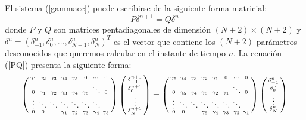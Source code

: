 El sistema (\ref{gammaec}) puede escribirse de la siguiente forma matricial:
\begin{equation}
\label{PQ}
    P\delta^{n+1}=Q\delta^{n}
\end{equation}
\noindent donde $P$ y $Q$ son matrices pentadiagonales de dimensión $(N+2)\times(N+2)$ y $\displaystyle \delta^{n}=(\delta_{-1}^{n},\delta_{0}^{n},\ldots,\delta_{N-1}^{n},\delta_{N}^{n})^{T}$ es el vector que contiene los $(N+2)$ parámetros desconocidos que queremos calcular en el instante de tiempo $n$. La ecuación (\ref{PQ}) presenta la siguiente forma:
 \begin{equation}\label{Matrizge}
     \small{
     \left(\begin{smallmatrix}
        \gamma_{1} & \gamma_{2} & \gamma_{3} & \gamma_{4} & \gamma_{5} & 0 & \cdots & 0\\
        0 & \gamma_{1} & \gamma_{2} & \gamma_{3} & \gamma_{4} & \gamma_{5} & \ddots & 0\\
        \vdots & \ddots & \ddots & \ddots & \ddots &\ddots & \ddots\\
        0 & 0 & \cdots & \gamma_{1} & \gamma_{2} & \gamma_{3} & \gamma_{4} & \gamma_{5}
    \end{smallmatrix}\right)
    \left(\begin{smallmatrix}
       \delta_{-1}^{n+1} \\
       \delta_{0}^{n+1}\\
        \vdots\\
        \delta_{N}^{n+1}
    \end{smallmatrix}\right) =
       \left(\begin{smallmatrix}
        \gamma_{5} & \gamma_{4} & \gamma_{3} & \gamma_{2} & \gamma_{1} & 0 & \cdots & 0\\
        0 & \gamma_{5} & \gamma_{4} & \gamma_{3} & \gamma_{2} & \gamma_{1} & \ddots & 0\\
        \vdots & \ddots & \ddots & \ddots & \ddots &\ddots & \ddots\\
        0 & 0 & \cdots & \gamma_{5} & \gamma_{4} & \gamma_{3} & \gamma_{2} & \gamma_{1}
    \end{smallmatrix}\right)
    \left(\begin{smallmatrix}
       \delta_{-1}^{n} \\
       \delta_{0}^{n}\\
        \vdots\\
        \delta_{N}^{n}
    \end{smallmatrix}\right)}
    \end{equation}


